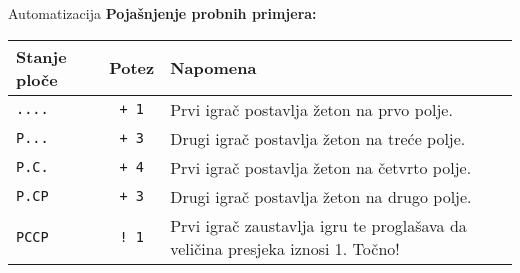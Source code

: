 \begin{statement}[
  problempoints=100,
  timelimit=1 sekunda,
  memorylimit=512 MiB,
]{Automatizacija}
\textbf{Pojašnjenje probnih primjera:}

{\renewcommand{\arraystretch}{1.4}
  \setlength{\tabcolsep}{6pt}
  \begin{tabular}{lcl}
    Stanje ploče & Potez & Napomena \\ \midrule
    \texttt{....} & \texttt{+ 1} & Prvi igrač postavlja žeton na prvo polje. \\
    \texttt{P...} & \texttt{+ 3} & Drugi igrač postavlja žeton na treće polje. \\
    \texttt{P.C.} & \texttt{+ 4} & Prvi igrač postavlja žeton na četvrto polje. \\
    \texttt{P.CP} & \texttt{+ 3} & Drugi igrač postavlja žeton na drugo polje. \\
    \texttt{PCCP} & \texttt{\frenchspacing! 1} & Prvi igrač zaustavlja igru te 
    proglašava da veličina presjeka iznosi 1. Točno! \\

\end{tabular}}

\end{statement}

